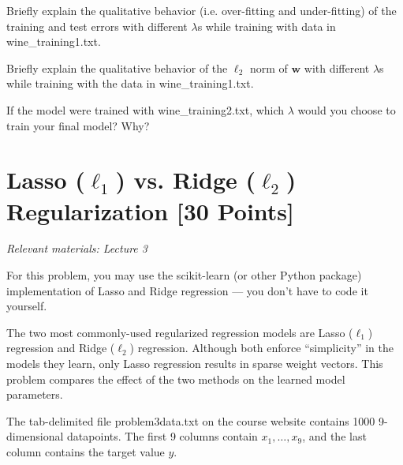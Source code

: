 \documentclass{article}
\begin{document}
\begin{solution}

\end{solution}

\problem[4]
Briefly explain the qualitative behavior (i.e. over-fitting and under-fitting) of the training and test errors with different $\lambda$s while training with data in wine\_training1.txt.

\begin{solution}

\end{solution}

\problem[4]
Briefly explain the qualitative behavior of the $\ell_2$ norm of $\textbf{w}$ with different $\lambda$s while training with the data in wine\_training1.txt.

\begin{solution}
   
\end{solution}

\problem[4]
If the model were trained with wine\_training2.txt, which $\lambda$ would you choose to train your final model? Why?

\begin{solution}
  
\end{solution}

\newpage
\section{Lasso (\texorpdfstring{$\ell_1$}{L1}) vs. Ridge (\texorpdfstring{$\ell_2$}{L2}) Regularization [30 Points]}
\textit{Relevant materials: Lecture 3}

For this problem, you may use the scikit-learn (or other Python package) implementation of Lasso and Ridge regression --- you don't have to code it yourself.

The two most commonly-used regularized regression models are Lasso ($\ell_1$) regression and Ridge ($\ell_2$) regression.
Although both enforce ``simplicity'' in the models they learn, only Lasso regression results in sparse weight vectors.
This problem compares the effect of the two methods on the learned model parameters.

\problem[12] 
The tab-delimited file problem3data.txt on the course website contains 1000 9-dimensional datapoints.  The first 9 columns contain $x_1,\ldots,x_9$, and the last column contains the target value $y$.
\end{document}
